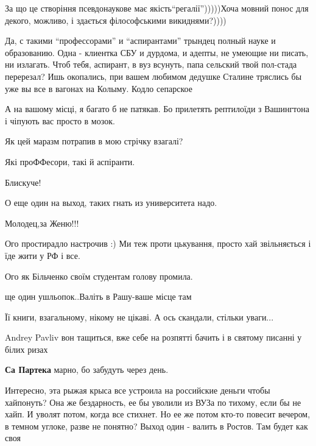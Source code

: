 \begin{itemize}

За що це створіння псевдонаукове має якість\enquote{регалії})))))Хоча мовний понос для декого, можливо, 
і здається філософськими викиднями?))))


Да, с такими \enquote{профессорами} и \enquote{аспирантами} трындец полный науке и образованию.
Одна - клиентка СБУ и дурдома, и адепты, не умеющие ни писать, ни излагать.
Чтоб тебя, аспирант, в вуз всунуть, папа сельский твой пол-стада перерезал? Ишь
окопались, при вашем любимом дедушке Сталине тряслись бы уже вы все в вагонах
на Колыму. Кодло сепарское

А на вашому місці, я багато б не патякав. Бо прилетять рептилоїди з Вашингтона і чіпують вас просто в мозок.

Як цей маразм потрапив в мою стрічку взагалі?

Які проФФесори, такі й аспіранти.

Блискуче!

О еще один на выход, таких гнать из университета надо.

Молодец,за Женю!!!

Ого простирадло настрочив :) Ми теж проти цькування, просто хай звільняється і їде жити у РФ і все.

Ого як Більченко своїм студентам голову промила.

ще один ушльопок..Валіть в Рашу-ваше місце там


Її книги, взагальному, нікому не цікаві. А ось скандали, стільки уваги...


Andrey Pavliv вон тащиться, вже себе на розпятті бачить і в святому писанні у білих ризах

\textbf{Са Партека} марно, бо забудуть через день.


Интересно, эта рыжая крыса все устроила на российские деньги чтобы хайпонуть?
Она же бездарность, ее бы уволили из ВУЗа по тихому, если бы не хайп. И уволят
потом, когда все стихнет. Но ее же потом кто-то повесит вечером, в темном
углоке, разве не понятно? Выход один - валить в Ростов. Там будет как своя


\end{itemize}
